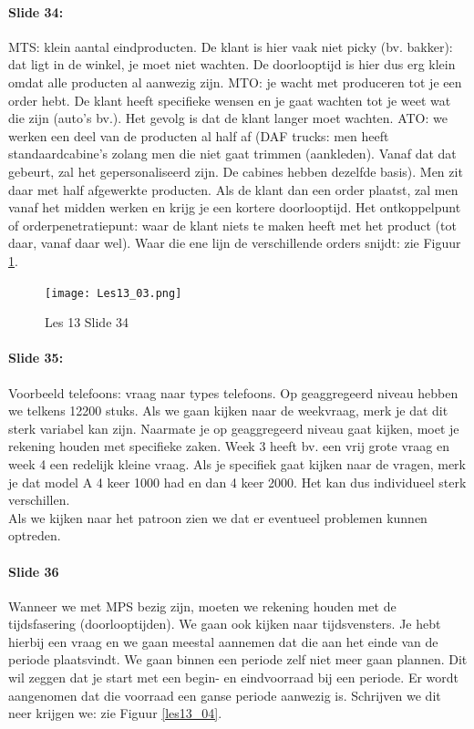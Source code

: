 \documentclass[10pt,a4paper]{report}
\begin{document}
\paragraph{Slide 34:} MTS: klein aantal eindproducten. De klant is hier vaak niet picky (bv. bakker): dat ligt in de winkel, je moet niet wachten. De doorlooptijd is hier dus erg klein omdat alle producten al aanwezig zijn. MTO: je wacht met produceren tot je een order hebt. De klant heeft specifieke wensen en je gaat wachten tot je weet wat die zijn (auto's bv.). Het gevolg is dat de klant langer moet wachten. ATO: we werken een deel van de producten al half af (DAF trucks: men heeft standaardcabine's zolang men die niet gaat trimmen (aankleden). Vanaf dat dat gebeurt, zal het gepersonaliseerd zijn. De cabines hebben dezelfde basis). Men zit daar met half afgewerkte producten. Als de klant dan een order plaatst, zal men vanaf het midden werken en krijg je een kortere doorlooptijd.
Het ontkoppelpunt of orderpenetratiepunt: waar de klant niets te maken heeft met het product (tot daar, vanaf daar wel). Waar die ene lijn de verschillende orders snijdt: zie Figuur \ref{les13_03}.

\begin{figure}[h!]
\centering
\texttt{[image: Les13\_03.png]}
\caption{Les 13 Slide 34} 
\label{les13_03}
\end{figure}


\paragraph{Slide 35:} Voorbeeld telefoons: vraag naar types telefoons. Op geaggregeerd niveau hebben we telkens 12200 stuks. Als we gaan kijken naar de weekvraag, merk je dat dit sterk variabel kan zijn. Naarmate je op geaggregeerd niveau gaat kijken, moet je rekening houden met specifieke zaken. Week 3 heeft bv. een vrij grote vraag en week 4 een redelijk kleine vraag. Als je specifiek gaat kijken naar de vragen, merk je dat model A 4 keer 1000 had en dan 4 keer 2000. Het kan dus individueel sterk verschillen.\\
Als we kijken naar het patroon zien we dat er eventueel problemen kunnen optreden.

\paragraph{Slide 36} Wanneer we met MPS bezig zijn, moeten we rekening houden met de tijdsfasering (doorlooptijden). We gaan ook kijken naar tijdsvensters. Je hebt hierbij een vraag en we gaan meestal aannemen dat die aan het einde van de periode plaatsvindt. We gaan binnen een periode zelf niet meer gaan plannen. Dit wil zeggen dat je start met een begin- en eindvoorraad bij een periode. Er wordt aangenomen dat die voorraad een ganse periode aanwezig is. Schrijven we dit neer krijgen we: zie Figuur \ref{les13_04}.
\end{document}
